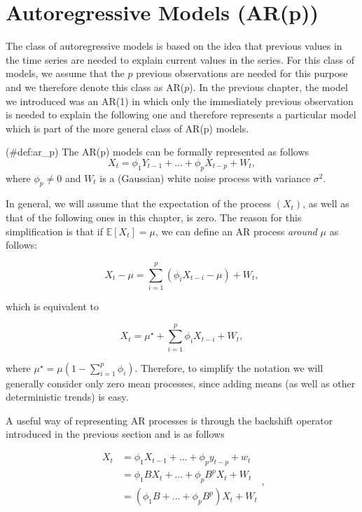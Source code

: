 \documentclass[]{book}
\theoremstyle{definition}
\theoremstyle{definition}
\theoremstyle{definition}
\theoremstyle{remark}
\let\BeginKnitrBlock\begin \let\EndKnitrBlock\end
\begin{document}
{\hypertarget{autoregressive-models-arp}{%
\section{Autoregressive Models
(AR(p))}\label{autoregressive-models-arp}}

The class of autoregressive models is based on the idea that previous
values in the time series are needed to explain current values in the
series. For this class of models, we assume that the \(p\) previous
observations are needed for this purpose and we therefore denote this
class as AR(\(p\)). In the previous chapter, the model we introduced was
an AR(1) in which only the immediately previous observation is needed to
explain the following one and therefore represents a particular model
which is part of the more general class of AR(p) models.

\BeginKnitrBlock{definition}
\protect\hypertarget{def:ar_p}{}{(\#def:ar\_p) }The AR(p) models can be
formally represented as follows
\[{X_t} = {\phi_1}{Y_{t - 1}} + ... + {\phi_p}{X_{t - p}} + {W_t},\]
where \(\phi_p \neq 0\) and \(W_t\) is a (Gaussian) white noise process
with variance \(\sigma^2\).
\EndKnitrBlock{definition}

In general, we will assume that the expectation of the process
\(({X_t})\), as well as that of the following ones in this chapter, is
zero. The reason for this simplification is that if
\(\mathbb{E} [ X_t ] = \mu\), we can define an AR process \emph{around}
\(\mu\) as follows:

\[X_t - \mu = \sum_{i = 1}^p \left(\phi_i X_{t-i} - \mu \right) + W_t,\]

which is equivalent to

\[X_t  = \mu^{\star} +  \sum_{i = 1}^p \phi_i X_{t-i}  + W_t,\]

where \(\mu^{\star} = \mu (1 - \sum_{i = 1}^p \phi_i)\). Therefore, to
simplify the notation we will generally consider only zero mean
processes, since adding means (as well as other deterministic trends) is
easy.

A useful way of representing AR processes is through the backshift
operator introduced in the previous section and is as follows

\[\begin{aligned}
  {X_t} &= {\phi_1}{X_{t - 1}} + ... + {\phi_p}{y_{t - p}} + {w_t} \\
   &= {\phi_1}B{X_t} + ... + {\phi_p}B^p{X_t} + {W_t} \\
   &= ({\phi_1}B + ... + {\phi_p}B^p){X_t} + {W_t} \\ 
\end{aligned},\]

}
\end{document}
